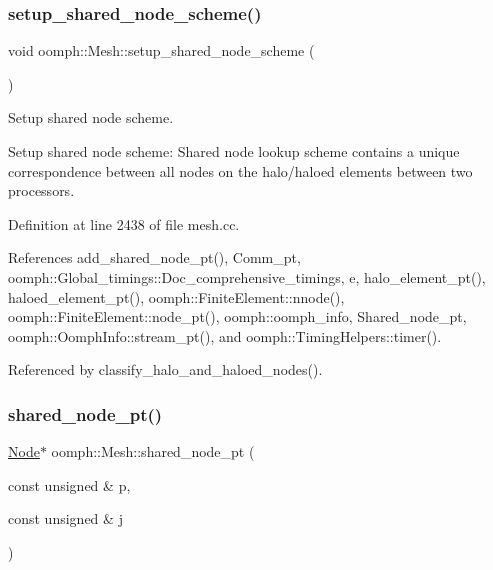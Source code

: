\subsubsection{\texorpdfstring{setup\+\_\+shared\+\_\+node\+\_\+scheme()}{setup\_shared\_node\_scheme()}}
{\footnotesize\ttfamily void oomph\+::\+Mesh\+::setup\+\_\+shared\+\_\+node\+\_\+scheme (\begin{DoxyParamCaption}{ }\end{DoxyParamCaption})\hspace{0.3cm}{\ttfamily [protected]}}



Setup shared node scheme. 

Setup shared node scheme\+: Shared node lookup scheme contains a unique correspondence between all nodes on the halo/haloed elements between two processors. 

Definition at line 2438 of file mesh.\+cc.



References add\+\_\+shared\+\_\+node\+\_\+pt(), Comm\+\_\+pt, oomph\+::\+Global\+\_\+timings\+::\+Doc\+\_\+comprehensive\+\_\+timings, e, halo\+\_\+element\+\_\+pt(), haloed\+\_\+element\+\_\+pt(), oomph\+::\+Finite\+Element\+::nnode(), oomph\+::\+Finite\+Element\+::node\+\_\+pt(), oomph\+::oomph\+\_\+info, Shared\+\_\+node\+\_\+pt, oomph\+::\+Oomph\+Info\+::stream\+\_\+pt(), and oomph\+::\+Timing\+Helpers\+::timer().



Referenced by classify\+\_\+halo\+\_\+and\+\_\+haloed\+\_\+nodes().

\mbox{\label{classoomph_1_1Mesh_a3a14d2f0329f8fe97ffa7f3835db0986}} 
\subsubsection{\texorpdfstring{shared\+\_\+node\+\_\+pt()}{shared\_node\_pt()}}
{\footnotesize\ttfamily \hyperlink{classoomph_1_1Node}{Node}$\ast$ oomph\+::\+Mesh\+::shared\+\_\+node\+\_\+pt (\begin{DoxyParamCaption}\item[{const unsigned \&}]{p,  }\item[{const unsigned \&}]{j }\end{DoxyParamCaption})\hspace{0.3cm}{\ttfamily [inline]}}



